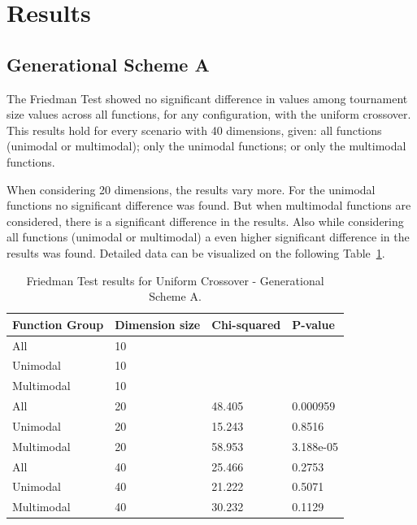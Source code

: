 \section{Results}\label{sec:results}

\subsection{Generational Scheme A}
The Friedman Test showed no significant difference in values among tournament size values across all functions, for any configuration, with the uniform crossover. This results hold for every scenario with 40 dimensions, given: all functions (unimodal or multimodal); only the unimodal functions; or only the multimodal functions. 

When considering 20 dimensions, the results vary more. For the unimodal functions no significant difference was found. But when multimodal functions are considered, there is a significant difference in the results. Also while considering all functions (unimodal or multimodal) a even higher significant difference in the results was found. Detailed data can be visualized on the following Table~\ref{Friedman_test_uniform}. 

\begin{table}[h]
	\centering
	\begin{tabular}{|l|l|l|l|}
		\hline
		\textbf{Function Group} & \textbf{Dimension size}      & \textbf{Chi-squared}        & \textbf{P-value}                     \\ \hline
		\multicolumn{1}{|l|}{All} & \multicolumn{1}{|l|}{10} & \multicolumn{1}{l|}{ } & \multicolumn{1}{l|}{ } \\ \hline
		\multicolumn{1}{|l|}{Unimodal} & \multicolumn{1}{|l|}{10} & \multicolumn{1}{l|}{ } & \multicolumn{1}{l|}{ } \\ \hline
		\multicolumn{1}{|l|}{Multimodal} & \multicolumn{1}{|l|}{10} & \multicolumn{1}{l|}{ } & \multicolumn{1}{l|}{ }  \\ \hline
		\hline
		\multicolumn{1}{|l|}{All} & \multicolumn{1}{|l|}{20} & \multicolumn{1}{l|}{48.405} & \multicolumn{1}{l|}{0.000959} \\ \hline
		\multicolumn{1}{|l|}{Unimodal} & \multicolumn{1}{|l|}{20} & \multicolumn{1}{l|}{15.243} & \multicolumn{1}{l|}{0.8516} \\ \hline
		\multicolumn{1}{|l|}{Multimodal} & \multicolumn{1}{|l|}{20} & \multicolumn{1}{l|}{58.953} & \multicolumn{1}{l|}{3.188e-05}  \\ \hline
		\hline	
		\multicolumn{1}{|l|}{All} & \multicolumn{1}{|l|}{40} & \multicolumn{1}{l|}{25.466} & \multicolumn{1}{l|}{0.2753} 						\\ \hline
		\multicolumn{1}{|l|}{Unimodal} & \multicolumn{1}{|l|}{40} & \multicolumn{1}{l|}{21.222} & \multicolumn{1}{l|}{0.5071} \\ \hline
		\multicolumn{1}{|l|}{Multimodal} & \multicolumn{1}{|l|}{40} & \multicolumn{1}{l|}{30.232} & \multicolumn{1}{l|}{0.1129}  \\ \hline
	\end{tabular}
	\caption{Friedman Test results for Uniform Crossover - Generational Scheme A.}
	\label{Friedman_test_uniform}	
\end{table}

